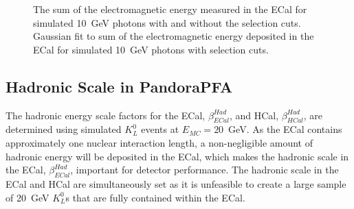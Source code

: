 \begin{figure}[h!]
\caption[\protect{} The sum of the electromagnetic energy measured in the ECal for simulated 10~GeV photons with and without the selection cuts.  \protect{} Gaussian fit to sum of the electromagnetic energy deposited in the ECal for simulated 10~GeV photons with selection cuts.]{\protect{} The sum of the electromagnetic energy measured in the ECal for simulated 10~GeV photons with and without the selection cuts.  \protect{} Gaussian fit to sum of the electromagnetic energy deposited in the ECal for simulated 10~GeV photons with selection cuts.}
\label{fig:ecalemscale}
\end{figure}


\subsection{Hadronic Scale in PandoraPFA}
\label{sec:hadscalesetting}
The hadronic energy scale factors for the ECal, $\beta^{Had}_{ECal}$, and HCal, $\beta^{Had}_{HCal}$, are determined using simulated $K^{0}_{L}$ events at $E_{MC} = 20$~GeV.  As the ECal contains approximately one nuclear interaction length, a non-negligible amount of hadronic energy will be deposited in the ECal, which makes the hadronic scale in the ECal, $\beta^{Had}_{ECal}$, important for detector performance.  The hadronic scale in the ECal and HCal are simultaneously set as it is unfeasible to create a large sample of 20~GeV $K^{0}_{L}$s that are fully contained within the ECal.

